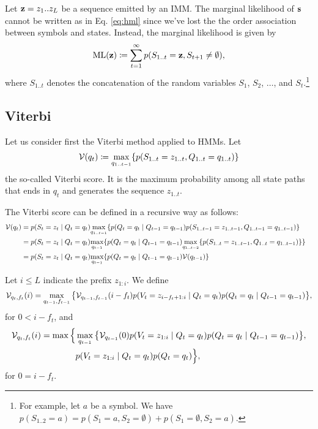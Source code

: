 Let $\mathbf{z}=z_1 .. z_L$ be a sequence emitted by an IMM.
The marginal likelihood of $\mathbf{s}$ cannot be written as in Eq. \eqref{eq:hml} since
we've lost the the order association between symbols and states.
Instead, the marginal likelihood is given by
\begin{align}\label{eq:ml}
  \mathrm{ML}(\mathbf{z}) \coloneqq \sum_{t=1}^{\infty} p(S_{1..t}=\mathbf{z}, S_{t+1}\neq \emptyset),
\end{align}
where $S_{1..t}$ denotes the concatenation of the random variables $S_1$, $S_2$,
$\dots$, and $S_t$.\footnote{For example, let $a$ be a symbol. We have
$p(S_{1..2}=a) = p(S_1=a, S_2=\emptyset) + p(S_1=\emptyset, S_2=a)$.}

\subsection{Viterbi}

Let us consider first the Viterbi method applied to HMMs.
Let
\begin{align*}
  \mathcal{V}(q_t) \coloneqq \underset{q_{1..t-1}}{\max} \{ p(S_{1..t}=z_{1..t}, Q_{1..t}=q_{1..t}) \}
\end{align*}
the so-called Viterbi score.
It is the maximum probability among all state paths that ends in $q_t$ and generates
the sequence $z_{1..t}$.

The Viterbi score can be defined in a recursive way as follows:
\begin{align*}
  \mathcal{V}(q_t)
  &= p(S_t=z_t \;|\; Q_t=q_t) \underset{q_{1..t-1}}{\max}
    \{ p(Q_t=q_t \;|\; Q_{t-1}=q_{t-1}) p(S_{1..t-1}=z_{1..t-1}, Q_{1..t-1}=q_{1..t-1}) \} &\\
  &= p(S_t=z_t \;|\; Q_t=q_t) \underset{q_{t-1}}{\max}
    \{ p(Q_t=q_t \;|\; Q_{t-1}=q_{t-1})
    \underset{q_{1..t-2}}{\max} \{ p(S_{1..t}=z_{1..t-1}, Q_{1..t}=q_{1..t-1}) \} \} &\\
  &= p(S_t=z_t \;|\; Q_t=q_t) \underset{q_{t-1}}{\max} \{ p(Q_t=q_t \;|\; Q_{t-1}=q_{t-1})
    \mathcal{V}(q_{t-1}) \} &
\end{align*}

Let $i \leq L$ indicate the prefix $z_{1:i}$.
We define
\begin{align*}
  \mathcal{V}_{q_t,f_t}(i) =
  \max_{q_{t-1}, f_{t-1}}
  \big\{
    \mathcal{V}_{q_{t-1},f_{t-1}}(i-f_t) p(V_t=z_{i-f_t+1:i} \;|\; Q_t=q_t) p(Q_t=q_t \;|\;
    Q_{t-1}=q_{t-1})
  \big\},
\end{align*}
for $0 < i - f_t$,
and
\begin{align*}
  \mathcal{V}_{q_t,f_t}(i) =
  \max
  \Big\{
    &\max_{q_{t-1}}
    \big\{
      \mathcal{V}_{q_{t-1}}(0) p(V_t=z_{1:i} \;|\; Q_t=q_t) p(Q_t=q_t \;|\;
      Q_{t-1}=q_{t-1})
    \big\},\\
    &p(V_t=z_{1:i} \;|\; Q_t=q_t) p(Q_t=q_t)
  \Big\},
\end{align*}
for $0 = i - f_t$.


